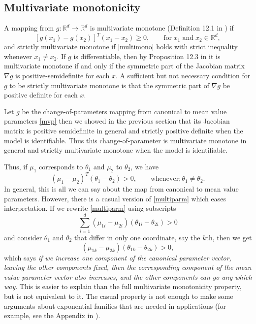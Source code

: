 \documentclass[
]{article}
\begin{document}
\hypertarget{multivariate-monotonicity}{%
\subsection{Multivariate monotonicity}\label{multivariate-monotonicity}}

A mapping from \(g : \mathbb{R}^d \to \mathbb{R}^d\) is multivariate
monotone (Definition 12.1 in \cite{rockafellar2009variational}) if
\begin{equation} \label{multimono}
  \left[g(x_1) - g(x_2)\right]^T(x_1 - x_2) \geq 0, \qquad \text{for} \; x_1 \; \text{and} \; x_2 \in \mathbb{R}^d,
\end{equation} and strictly multivariate monotone if \eqref{multimono}
holds with strict inequality whenever \(x_1 \neq x_2\). If \(g\) is
differentiable, then by Proposition 12.3 in
\cite{rockafellar2009variational} it is multivariate monotone if and
only if the symmetric part of the Jacobian matrix \(\nabla g\) is
positive-semidefinite for each \(x\). A sufficient but not necessary
condition for \(g\) to be strictly multivariate monotone is that the
symmetric part of \(\nabla g\) be positive definite for each \(x\).

Let \(g\) be the change-of-parameters mapping from canonical to mean
value parameters \eqref{mvp} then we showed in the previous section that
its Jacobian matrix is positive semidefinite in general and strictly
positive definite when the model is identifiable. Thus this
change-of-parameter is multivariate monotone in general and strictly
multivariate monotone when the model is identifiable.

Thus, if \(\mu_1\) corresponds to \(\theta_1\) and \(\mu_2\) to
\(\theta_2\), we have \begin{equation} \label{multiparm}
  (\mu_1 - \mu_2)^T(\theta_1 - \theta_2) > 0, \qquad \text{whenever} ; \theta_1 \neq \theta_2.
\end{equation} In general, this is all we can say about the map from
canonical to mean value parameters. However, there is a casual version
of \eqref{multiparm} which eases interpretation. If we rewrite
\eqref{multiparm} using subscripts \[
  \sum_{i=1}^d(\mu_{1i} - \mu_{2i})(\theta_{1i} - \theta_{2i}) > 0
\] and consider \(\theta_1\) and \(\theta_2\) that differ in only one
coordinate, say the \(k\)th, then we get \[
  (\mu_{1k} - \mu_{2k})(\theta_{1k} - \theta_{2k}) > 0,
\] which says
\emph{if we increase one component of the canonical parameter vector, leaving the other components fixed, then the corresponding component of the mean value parameter vector also increases, and the other components can go any which way}.
This is easier to explain than the full multivariate monotonicity
property, but is not equivalent to it. The casual property is not enough
to make some arguments about exponential families that are needed in
applications (for example, see the Appendix in
\cite{shaw2010inferring}).
\end{document}
